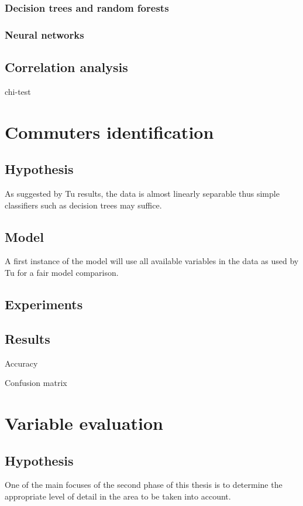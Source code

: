 \documentclass{article}
\begin{document}
\subsubsection{Decision trees and random forests}

\subsubsection{Neural networks}

\subsection{Correlation analysis}
chi-test


\newpage
\section{Commuters identification}
\subsection{Hypothesis}
As suggested by Tu \cite{tu2016impact} results, the data is almost linearly separable thus simple classifiers such as decision trees may suffice. 


\subsection{Model}
A first instance of the model will use all available variables in the data as used by Tu \cite{tu2016impact} for a fair model comparison. 

\subsection{Experiments}

\subsection{Results}

Accuracy

Confusion matrix


\newpage
\section{Variable evaluation}
\subsection{Hypothesis}
One of the main focuses of the second phase of this thesis is to determine the appropriate level of detail in the area to be taken into account. 
\end{document}

